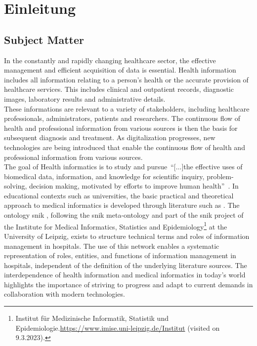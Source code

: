 \chapter{Einleitung}\label{ch:introduction}
\section{Subject Matter}
In the constantly and rapidly changing healthcare sector, the effective management and efficient acquisition of data is essential. 
Health information includes all information relating to a person's health or the accurate provision of healthcare services. This includes clinical and outpatient records, diagnostic images, laboratory results and administrative details.\\
%
These informations are relevant to a variety of stakeholders, including healthcare professionals, administrators, patients and researchers. 
The continuous flow of health and professional information from various sources is then the basis for subsequent diagnosis and treatment. 
As digitalization progresses, new technologies are being introduced that enable the continuous flow of health and professional information from various sources.\\
%
The goal of Health informatics is to study and pursue~\enquote{[$\dots$]the effective uses of biomedical data, information, and knowledge for scientific inquiry, problem-solving, decision making, motivated by efforts to improve human health}\ \citet{jen_informatics_2024}.
In educational contexts such as universities, the basic practical and theoretical approach to medical informatics is developed through literature such as \citet{bb2}. 
The ontology \ac{snik} \citep{semantischesnetz}, following the \ac{snik} meta-ontology and part of the \ac{snik} project of the Institute for Medical Informatics, Statistics and Epidemiology\footnote{\raggedright{}Institut für Medizinische Informatik, Statistik und Epidemiologie.\url{https://www.imise.uni-leipzig.de/Institut} (visited on 9.3.2023).} at the University of Leipzig, exists to structure technical terms and roles of information management in hospitals. 
The use of this network enables a systematic representation of roles, entities, and functions of information management in hospitals, independent of the definition of the underlying literature sources. 
The interdependence of health information and medical informatics in today's world highlights the importance of striving to progress and adapt to current demands in collaboration with modern technologies.
